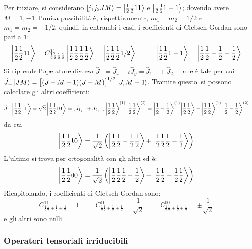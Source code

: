 \documentclass[11pt, a4paper]{scrartcl} %
\numberwithin{equation}{subsection}
\theoremstyle{style2}
\theoremstyle{style1}
\begin{document}
Per iniziare, si considerano $\ket{j_1j_2 JM}= \Ket{\frac{1}{2}\frac{1}{2} 1 1 } $ e $\Ket{\frac{1}{2}\frac{1}{2} 1 -1} $; dovendo avere $M= 1, -1 $, l'unica possibilit\`a \`e, rispettivamente, $m_1 = m_2 = 1/2$ e $m_1=m_2= -1 / 2$, quindi, in entrambi i casi, i coefficienti di Clebsch-Gordan sono pari a $1$:
\[
\Ket{\frac{1}{2}\frac{1}{2}11} = C^{1 1} _{\frac{1}{2}\frac{1}{2}\frac{1}{2}\frac{1}{2}}  \Ket{\frac{1}{2}\frac{1}{2}\frac{1}{2}\frac{1}{2}} = \Ket{\frac{1}{2}\frac{1}{2}\frac{1}{2}1/2} \hspace{1cm}\Ket{\frac{1}{2}\frac{1}{2}1-1} =  \Ket{\frac{1}{2}\frac{1}{2}-\frac{1}{2}-\frac{1}{2}} 
\] 
Si riprende l'operatore discesa $\hat{J}_- =  \hat{J}_x - i \hat{J}_y = \hat{J}_{1,-} + \hat{J}_{2,-} $, che \`e tale per cui $\hat{J}_- \ket{JM}= \big[ (J-M+1)(J+M) \big] ^{1 / 2} \ket{J, M-1}$.
Tramite questo, si possono calcolare gli altri coefficienti:
\[
\hat{J}_- \Ket{\frac{1}{2}\frac{1}{2}1  1} = \sqrt{2} \Ket{\frac{1}{2}\frac{1}{2}10} = (\hat{J}_{1,-} + \hat{J}_{2,-} ) \Ket{\frac{1}{2}\frac{1}{2}} ^{(1)}  \Ket{\frac{1}{2}\frac{1}{2}} ^{(2)} = \Ket{\frac{1}{2}-\frac{1}{2}} ^{(1)}  \Ket{\frac{1}{2}\frac{1}{2}} + \Ket{\frac{1}{2}\frac{1}{2}} ^{(1)} \Ket{\frac{1}{2}-\frac{1}{2}} ^{(2)} 
\] 
da cui
\begin{equation*}
	\Ket{\frac{1}{2}\frac{1}{2}10} =\frac{1}{\sqrt{2} }\left(\Ket{\frac{1}{2}\frac{1}{2}-\frac{1}{2}\frac{1}{2}} + \Ket{\frac{1}{2}\frac{1}{2}\frac{1}{2}-\frac{1}{2}}\right)  
\end{equation*}
L'ultimo si trova per ortogonalit\`a con gli altri ed \`e:
\[
\Ket{\frac{1}{2}\frac{1}{2}00} =\frac{1}{\sqrt{2} }\left(\Ket{\frac{1}{2}\frac{1}{2}\frac{1}{2}-\frac{1}{2}} - \Ket{\frac{1}{2}\frac{1}{2}-\frac{1}{2}\frac{1}{2}} \right) 
\] 
Ricapitolando, i coefficienti di Clebsch-Gordan sono:
\[
C^{11} _{\frac{1}{2}\frac{1}{2}\pm\frac{1}{2}\pm \frac{1}{2}} = 1 \hspace{1cm} C^{10} _{\frac{1}{2}\frac{1}{2}\pm\frac{1}{2}\mp\frac{1}{2}} = \frac{1}{\sqrt{2} } \hspace{1cm} C^{00} _{\frac{1}{2}\frac{1}{2}\pm \frac{1}{2}\mp \frac{1}{2} } =\pm \frac{1}{\sqrt{2} }
\] 
e gli altri sono nulli.

\subsubsection{Operatori tensoriali irriducibili}
\end{document}
